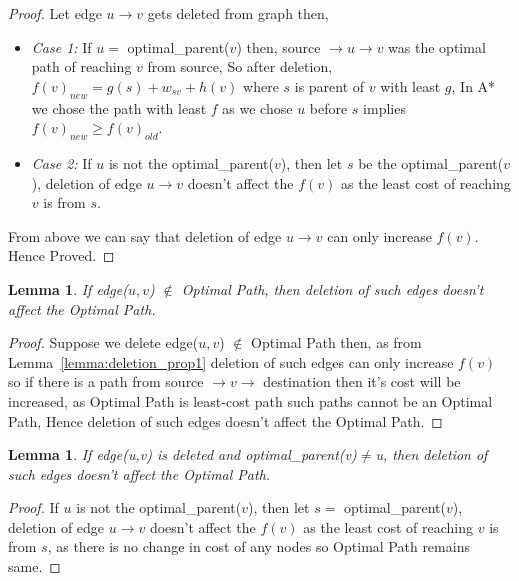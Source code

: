 \documentclass[a4paper]{article}
\newtheorem{lemma}[theorem]{Lemma}
\begin{document}
\begin{proof}
  Let edge $ u \rightarrow v$ gets deleted from graph then,
\begin{itemize}[label={}]
    \item \textit{Case 1:} If $u =$ optimal\_parent($v$) then, source $\rightarrow u \rightarrow v$ was the optimal path of reaching $v$ from source, So after deletion, $f(v)_{new} = g(s) + w_{sv} + h(v)$ where $s$ is parent of $v$ with least $g$, In A* we chose the path with least $f$ as we chose $u$ before $s$ implies $f(v)_{new} \geq f(v)_{old}$.
    \item \textit{Case 2:} If $u$ is  not the optimal\_parent($v$), then let $s$ be the optimal\_parent($v$), deletion of edge $u \rightarrow v$ doesn't affect the $f(v)$ as the least cost of reaching $v$ is from $s$.
\end{itemize}
From above we can say that deletion of edge $u \rightarrow v$ can only increase $f(v)$. Hence Proved.
\end{proof}
\begin{lemma}\label{lemma:deletion_prop2}
If edge($u,v$) $\notin$ Optimal Path, then deletion of such edges doesn't affect the Optimal Path.
\end{lemma}
\begin{proof}
  Suppose we delete edge($u,v$) $\notin$ Optimal Path then, as from Lemma~\ref{lemma:deletion_prop1} deletion of such edges can only increase $f(v)$ so if there is a path from source $\rightarrow v \rightarrow$ destination then it's cost will be increased, as Optimal Path is least-cost path such paths cannot be an Optimal Path, Hence deletion of such edges doesn't affect the Optimal Path.
\end{proof}

\begin{lemma}\label{lemma:deletion_prop3}
If edge(u,v) is deleted and optimal\_parent(v)$\neq$u, then deletion of such edges doesn't affect the Optimal Path.
\end{lemma}
\begin{proof}
  If $u$ is  not the optimal\_parent($v$), then let $s =$ optimal\_parent($v$), deletion of edge $u \rightarrow v$ doesn't affect the $f(v)$ as the least cost of reaching $v$ is from $s$, as there is no change in cost of any nodes so Optimal Path remains same.
\end{proof}
\end{document}
